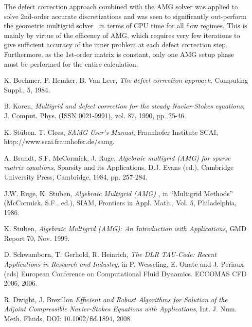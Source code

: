 \documentclass{report}
\begin{document}
The defect correction approach combined with the AMG solver was applied
to solve 2nd-order accurate
discretizations and was seen to significantly out-perform the geometric
multigrid solver~\cite{TAU, TAU_lin}
in terms of CPU time for all flow regimes. This is mainly by virtue of
the efficency of AMG, which requires
very few iterations to give sufficient accuracy of the inner problem at
each defect correction step.
Furthermore, as the 1st-order matrix is constant, only one AMG setup
phase must be performed for
the entire calculation.

\begin{thebibliography}{99}

K. Boehmer, P. Hemker, B. Van Leer,
{\em The defect correction approach},
Computing Suppl., 5, 1984.

B. Koren,
{\em Multigrid and defect correction for the steady Navier-Stokes equations},
J. Comput. Phys. (ISSN 0021-9991), vol. 87, 1990, pp. 25-46.

K. St{\"u}ben, T. Clees,
{\em SAMG User's Manual},
Fraunhofer Institute SCAI, http://www.scai.fraunhofer.de/samg.

A. Brandt, S.F. McCormick, J. Ruge,
{\em Algebraic multigrid (AMG) for sparse matrix equations},
Sparsity and its Applications, D.J. Evans (ed.),
Cambridge University Press, Cambridge, 1984, pp. 257-284.

J.W. Ruge, K. St{\"u}ben,
{\em Algebraic Multigrid (AMG) },
in ``Multigrid Methods'' (McCormick, S.F., ed.), SIAM, Frontiers in Appl. Math., Vol. 5,
Philadelphia, 1986.

K. St{\"u}ben,
{ \em Algebraic Multigrid (AMG): An Introduction with Applications},
GMD Report 70, Nov. 1999.

D. Schwamborn, T. Gerhold, R. Heinrich,
{ \em The DLR TAU-Code: Recent Applications in Research and Industry},
in P. Wesseling, E. Onate and J. Periaux (eds) European Conference on
Computational Fluid Dynamics. ECCOMAS CFD 2006, 2006.

R. Dwight, J. Brezillon
{ \em Efficient and Robust Algorithms for Solution of the Adjoint
Compressible Navier-Stokes Equations with Applications},
Int. J. Num. Meth. Fluids, DOI: 10.1002/fld.1894, 2008.

\end{thebibliography}
\end{document}
